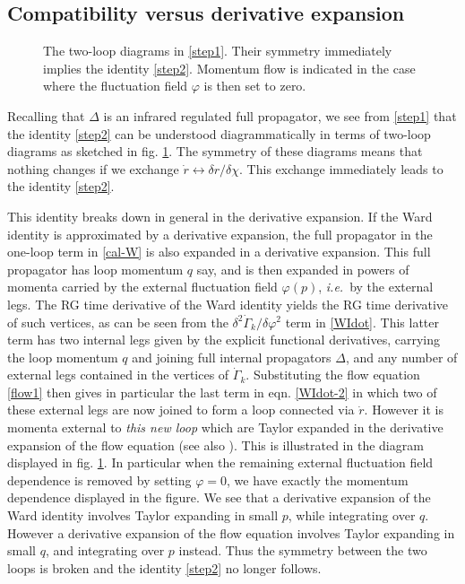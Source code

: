 \documentclass[11pt]{book} %
\newcommand\ie{\textit{i.e.}\ }
\numberwithin{equation}{chapter}
\begin{document}
\subsection{Compatibility versus derivative expansion}
\label{sec:exact-vs-derivatives}

\begin{figure}
  \begin{center}
    
  \end{center}
  \caption{
    The two-loop diagrams in \eqref{step1}.
    Their symmetry immediately implies the identity \eqref{step2}.
    Momentum flow is indicated in the case where the fluctuation field $\varphi$ is then set to zero.
  }
  \label{fig:two-loop}
\end{figure}
Recalling that $\Delta$ is an infrared regulated full propagator,
we see from \eqref{step1} that the identity \eqref{step2} can be understood diagrammatically
in terms of two-loop diagrams as sketched in fig. \ref{fig:two-loop}.
The symmetry of these diagrams means that nothing changes if we
exchange $\dot{r}\leftrightarrow\delta r/\delta\chi$.
This exchange immediately leads to the identity \eqref{step2}.

This identity breaks down in general in the derivative expansion.
If the Ward identity is approximated by a derivative expansion,
the full propagator in the one-loop term in \eqref{cal-W} is also expanded in a derivative expansion.
This full propagator has loop momentum $q$ say,
and is then expanded in powers of momenta carried by the external fluctuation
field $\varphi(p)$, \ie by the external legs.
The RG time derivative of the Ward identity yields the RG time derivative of such vertices,
as can be seen from the $\delta^2\dot{\Gamma}_k/\delta\varphi^2$ term  in \eqref{WIdot}.
This latter term has two internal legs given by the explicit functional derivatives,
carrying the loop momentum $q$ and joining full internal propagators $\Delta$,
and any number of external legs contained in the vertices of $\dot{\Gamma}_k$.
Substituting the flow equation \eqref{flow1} then gives in particular the last term in
eqn. \eqref{WIdot-2} in which two of these external legs are now joined to form a loop
connected via $\dot{r}$.  However it is momenta external to \emph{this new loop} which are
Taylor expanded in the derivative expansion of the flow equation
(see also \cite{Morris:1999ba, Morris:2000hm}).
This is illustrated in the diagram displayed in fig. \ref{fig:two-loop}.
In particular when the remaining external fluctuation field dependence is removed by setting $\varphi=0$,
we have exactly the momentum dependence displayed in the figure.
We see that a derivative expansion of the Ward identity involves Taylor expanding in small $p$,
while integrating over $q$.
However a derivative expansion of the flow equation involves Taylor expanding in small $q$,
and integrating over $p$ instead.
Thus the symmetry between the two loops is broken and the identity \eqref{step2} no longer follows.
\end{document}
